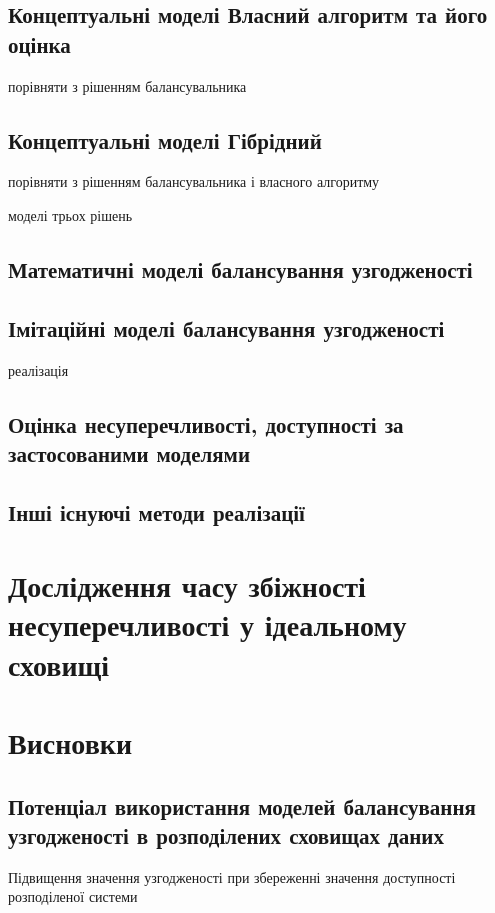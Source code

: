 \documentclass[14pt]{vakthesis}
\begin{document}
\section{Концептуальні моделі Власний алгоритм та його оцінка}
порівняти з рішенням балансувальника
\section{Концептуальні моделі Гібрідний}
порівняти з рішенням балансувальника і власного алгоритму


моделі трьох рішень

\section{Математичні моделі балансування узгодженості}
\section{Імітаційні моделі балансування узгодженості}
реалізація
\section{Оцінка несуперечливості, доступності за застосованими моделями}
\section{Інші існуючі методи реалізації}

\chapter{Дослідження часу збіжності несуперечливості у ідеальному сховищі}

\chapter{Висновки}
\section{Потенціал використання моделей балансування узгодженості в розподілених сховищах даних}
Підвищення значення узгодженості при збереженні значення доступності розподіленої системи
\end{document}
